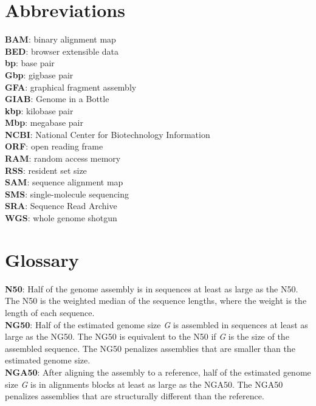 \documentclass[
  12pt,
  oneside,
  openany]{book}
\begin{document}
\hypertarget{abbreviations}{%
\section*{Abbreviations}\label{abbreviations}}

\textbf{BAM}: binary alignment map\\
\textbf{BED}: browser extensible data\\
\textbf{bp}: base pair\\
\textbf{Gbp}: gigbase pair\\
\textbf{GFA}: graphical fragment assembly\\
\textbf{GIAB}: Genome in a Bottle\\
\textbf{kbp}: kilobase pair\\
\textbf{Mbp}: megabase pair\\
\textbf{NCBI}: National Center for Biotechnology Information\\
\textbf{ORF}: open reading frame\\
\textbf{RAM}: random access memory\\
\textbf{RSS}: resident set size\\
\textbf{SAM}: sequence alignment map\\
\textbf{SMS}: single-molecule sequencing\\
\textbf{SRA}: Sequence Read Archive\\
\textbf{WGS}: whole genome shotgun

\newpage

\hypertarget{glossary}{%
\section*{Glossary}\label{glossary}}

\textbf{N50}: Half of the genome assembly is in sequences at least as large as the N50. The N50 is the weighted median of the sequence lengths, where the weight is the length of each sequence.\\
\textbf{NG50}: Half of the estimated genome size \emph{G} is assembled in sequences at least as large as the NG50. The NG50 is equivalent to the N50 if \emph{G} is the size of the assembled sequence. The NG50 penalizes assemblies that are smaller than the estimated genome size.\\
\textbf{NGA50}: After aligning the assembly to a reference, half of the estimated genome size \emph{G} is in alignments blocks at least as large as the NGA50. The NGA50 penalizes assemblies that are structurally different than the reference.
\end{document}
